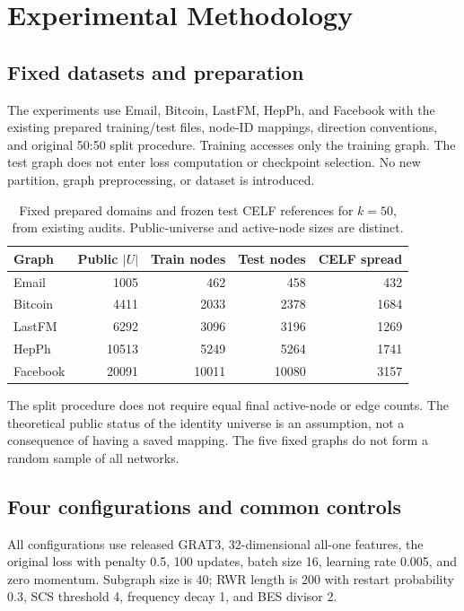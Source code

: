 \chapter{Experimental Methodology}\label{ch:design}
\section{Fixed datasets and preparation}
The experiments use Email, Bitcoin, LastFM, HepPh, and Facebook with the existing prepared training/test files, node-ID mappings, direction conventions, and original 50:50 split procedure. Training accesses only the training graph. The test graph does not enter loss computation or checkpoint selection. No new partition, graph preprocessing, or dataset is introduced.

\begin{table}[htbp]
\centering\small
\caption{Fixed prepared domains and frozen test CELF references for $k=50$, from existing audits. Public-universe and active-node sizes are distinct.}\label{tab:datasets}
\begin{tabular}{lrrrr}\toprule
Graph & Public $|U|$ & Train nodes & Test nodes & CELF spread\\\midrule
Email & 1005 & 462 & 458 & 432\\
Bitcoin & 4411 & 2033 & 2378 & 1684\\
LastFM & 6292 & 3096 & 3196 & 1269\\
HepPh & 10513 & 5249 & 5264 & 1741\\
Facebook & 20091 & 10011 & 10080 & 3157\\\bottomrule
\end{tabular}
\end{table}

The split procedure does not require equal final active-node or edge counts. The theoretical public status of the identity universe is an assumption, not a consequence of having a saved mapping. The five fixed graphs do not form a random sample of all networks.

\section{Four configurations and common controls}
All configurations use released GRAT3, 32-dimensional all-one features, the original loss with penalty 0.5, 100 updates, batch size 16, learning rate 0.005, and zero momentum. Subgraph size is 40; RWR length is 200 with restart probability 0.3, SCS threshold 4, frequency decay 1, and BES divisor 2.

